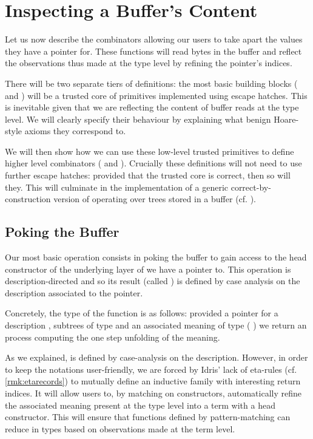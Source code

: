 \section{Inspecting a Buffer's Content}\label{sec:poking}

Let us now describe the combinators allowing our users to
take apart the values they have a pointer for.
%
These functions will read bytes in the buffer and reflect
the observations thus made at the type level by refining
the pointer's indices.

There will be two separate tiers of definitions: the most
basic building blocks ( and )
will be a trusted core of primitives implemented using
escape hatches.
%
This is inevitable given that we are reflecting the content
of buffer reads at the type level.
%
We will clearly specify their behaviour by explaining what
benign Hoare-style axioms they correspond to.

We will then show how we can use these low-level trusted
primitives to define higher level combinators
( and ).
%
Crucially these definitions will not need to use further
escape hatches: provided that the trusted core is correct,
then so will they.
%
This will culminate in the implementation of a generic
correct-by-construction version of 
operating over trees stored in a buffer (cf. ).

\subsection{Poking the Buffer}\label{sec:poke}

Our most basic operation consists in poking the buffer to gain
access to the head constructor of the underlying layer of
 we have a pointer to.
%
This operation is description-directed and so its result (called
) is defined by case analysis on the description
associated to the pointer.

Concretely, the type of the function is as follows: provided a pointer for
a description , subtrees of type  and an
associated meaning  of type
(  )
we return an  process computing the one step
unfolding of the meaning.


As we explained,  is defined by case-analysis
on the description.
%
However, in order to keep the notations user-friendly, we
are forced by Idris' lack of eta-rules (cf. \cref{rmk:etarecords})
to mutually define
an inductive family  with interesting return
indices.
%
It will allow users to, by matching on 
constructors, automatically refine the associated meaning
present at the type level into a term with a head constructor.
%
This will ensure that functions defined by pattern-matching
can reduce in types based on observations made at the term
level.

